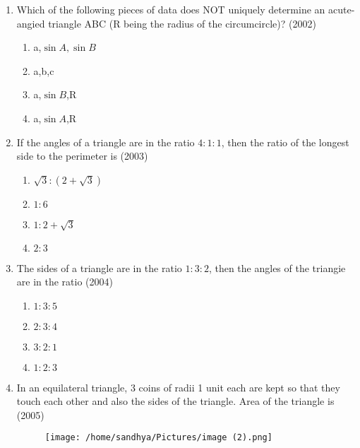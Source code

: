 \documentclass[12pt]{article}
\begin{document}
\begin{enumerate}
\item Which of the following pieces of data does NOT uniquely determine an acute-angied triangle ABC (R being the radius of the circumcircle)? (2002)
\begin{enumerate}
\item a,$\sin A,\sin B$
\item a,b,c
\item a,$\sin B$,R
\item a,$\sin A$,R
\end{enumerate}
\item If the angles of a triangle are in the ratio $4:1:1$, then the ratio of the longest side to the perimeter is (2003)
\begin{enumerate}
\item $\sqrt{3}:(2+\sqrt{3})$
\item $1:6$
\item $1:2+\sqrt{3}$
\item $2:3$
\end{enumerate}
\item The sides of a triangle are in the ratio $1:3:2$, then the angles of the triangie are in the ratio (2004)
\begin{enumerate}
\item $1:3:5$
\item $2:3:4$
\item $3:2:1$
\item $1:2:3$
\end{enumerate}
\item In an equilateral triangle, 3 coins of radii 1 unit each are kept so that they touch each other and also the sides of the triangle. Area of the triangle is  (2005)
\pagebreak
\begin{figure}[!h]
\centering
  \texttt{[image: /home/sandhya/Pictures/image (2).png]}
 \caption{}
 \label{}
 \end{figure}


\end{enumerate}
\end{document}

